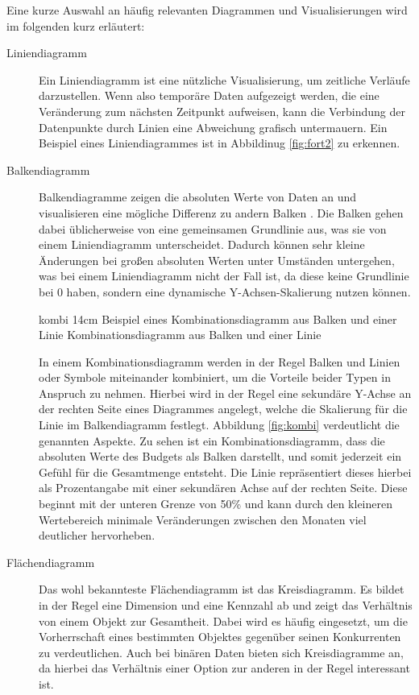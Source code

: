 Eine kurze Auswahl an häufig relevanten Diagrammen und Visualisierungen wird im folgenden kurz erläutert:
\begin{description}
\item[Liniendiagramm] Ein Liniendiagramm ist eine nützliche Visualisierung, um zeitliche Verläufe darzustellen. 
Wenn also temporäre Daten aufgezeigt werden, die eine Veränderung zum nächsten Zeitpunkt aufweisen, kann die Verbindung der Datenpunkte durch Linien eine Abweichung grafisch untermauern. 
Ein Beispiel eines Liniendiagrammes ist in Abbildinug \ref{fig:fort2} zu erkennen.

\item[Balkendiagramm] Balkendiagramme zeigen die absoluten Werte von Daten an und visualisieren eine mögliche Differenz zu andern Balken \cite[S.54]{Bounford.2001}.
Die Balken gehen dabei üblicherweise von eine gemeinsamen Grundlinie aus, was sie von einem Liniendiagramm unterscheidet.
Dadurch können sehr kleine Änderungen bei großen absoluten Werten unter Umständen untergehen, was bei einem Liniendiagramm nicht der Fall ist, da diese keine Grundlinie bei 0 haben, sondern eine dynamische Y-Achsen-Skalierung nutzen können.

\bild
{kombi}
{14cm}
{Beispiel eines Kombinationsdiagramm aus Balken und einer Linie}
{Kombinationsdiagramm aus Balken und einer Linie}

In einem Kombinationsdiagramm werden in der Regel Balken und Linien oder Symbole miteinander kombiniert, um die Vorteile beider Typen in Anspruch zu nehmen.
Hierbei wird in der Regel eine sekundäre Y-Achse an der rechten Seite eines Diagrammes angelegt, welche die Skalierung für die Linie im Balkendiagramm festlegt.
Abbildung \ref{fig:kombi} verdeutlicht die genannten Aspekte.
Zu sehen ist ein Kombinationsdiagramm, dass die absoluten Werte des Budgets als Balken darstellt, und somit jederzeit ein Gefühl für die Gesamtmenge entsteht.
Die Linie repräsentiert dieses hierbei als Prozentangabe mit einer sekundären Achse auf der rechten Seite.
Diese beginnt mit der unteren Grenze von 50\% und kann durch den kleineren Wertebereich minimale Veränderungen zwischen den Monaten viel deutlicher hervorheben.

\item[Flächendiagramm] Das wohl bekannteste Flächendiagramm ist das Kreisdiagramm. 
Es bildet in der Regel eine Dimension und eine Kennzahl ab und zeigt das Verhältnis von einem Objekt zur Gesamtheit.
Dabei wird es häufig eingesetzt, um die Vorherrschaft eines bestimmten Objektes gegenüber seinen Konkurrenten zu verdeutlichen.
Auch bei binären Daten bieten sich Kreisdiagramme an, da hierbei das Verhältnis einer Option zur anderen in der Regel interessant ist.


\end{description}
